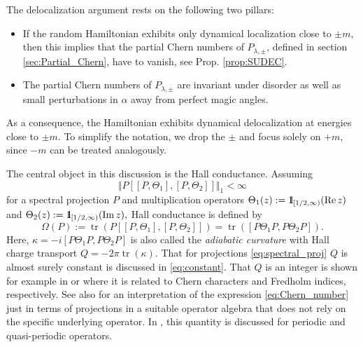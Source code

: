 \documentclass[reqno,12pt,letterpaper]{amsart}
\numberwithin{equation}{section}
\DeclareMathOperator{\Imag}{Im}
\let\Im=\Imag
\DeclareMathOperator{\Real}{Re}
\let\Re=\Real
\DeclareMathOperator{\tr}{tr}
\def\indic{\operatorname{1\hskip-2.75pt\relax l}}
\begin{document}
The delocalization argument rests on the following two pillars:
\begin{itemize}
\item If the random Hamiltonian exhibits only dynamical localization close to $\pm m$, then this implies that the partial Chern numbers of $ P_{\lambda,\pm}$, defined in section \ref{sec:Partial_Chern}, have to vanish, see Prop. \ref{prop:SUDEC}.
\item The partial Chern numbers of $ P_{\lambda,\pm}$ are invariant under disorder as well as small perturbations in $\alpha$ away from perfect magic angles.
\end{itemize}
As a consequence, the Hamiltonian exhibits dynamical delocalization at energies close to $\pm m$. To simplify the notation, we drop the $\pm$ and focus solely on $+m$, since $-m$ can be treated analogously. 

The central object in this discussion is the Hall conductance. Assuming 
\[ \Vert P[[P,\Theta_1],[P,\Theta_2]] \Vert_1<\infty \]
 for a spectral projection $P$ and multiplication operators $\Theta_1(z):=\indic_{[1/2,\infty)}(\Re z)$ and $\Theta_2(z):=\indic_{[1/2,\infty)}(\Im z),$ Hall conductance is defined by
\begin{equation}
\label{eq:Chern_number}
 \Omega(P) := \tr(P[[P,\Theta_1],[P,\Theta_2]]) = \tr([P\Theta_1 P , P \Theta_2P]).
 \end{equation}
Here, $\kappa = -i [P \Theta_1 P , P \Theta_2 P]$ is also called the \emph{adiabatic curvature} with Hall charge transport $Q = -2\pi \tr(\kappa).$ {That for projections \eqref{eq:spectral_proj} $Q$ is almost surely constant is discussed in \eqref{eq:constant}. That $Q$ is an integer is shown for example in \cite[Theorem $8.2$]{ASS} or \cite[(49),(58)]{BES94} where it is related to Chern characters and Fredholm indices, respectively. See also \cite{B88} for an interpretation of the expression \eqref{eq:Chern_number} just in terms of projections in a suitable operator algebra that does not rely on the specific underlying operator.} In \cite[Theorem $1$]{BES94}, this quantity is discussed for periodic and quasi-periodic operators. 
\end{document}
